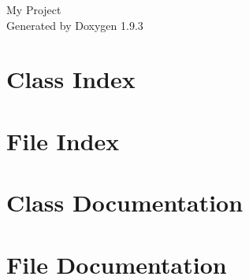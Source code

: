 \documentclass[twoside]{book}
\newcommand{\+}{\discretionary{\mbox{\scriptsize$\hookleftarrow$}}{}{}}
\newcommand{\clearemptydoublepage}{%
    \newpage{\pagestyle{empty}\cleardoublepage}%
  }
\begin{document}
  \raggedbottom
    \hypersetup{pageanchor=false,
                bookmarksnumbered=true,
                pdfencoding=unicode
               }
  \begin{titlepage}
  \vspace*{7cm}
  \begin{center}%
  {\Large My Project}\\
  \vspace*{1cm}
  {\large Generated by Doxygen 1.9.3}\\
  \end{center}
  \end{titlepage}
  \clearemptydoublepage
  \tableofcontents
  \clearemptydoublepage
  \hypersetup{pageanchor=true}
\chapter{Class Index}

\chapter{File Index}

\chapter{Class Documentation}

\chapter{File Documentation}

  \backmatter
  \newpage
  \clearemptydoublepage
  \printindex
\end{document}
